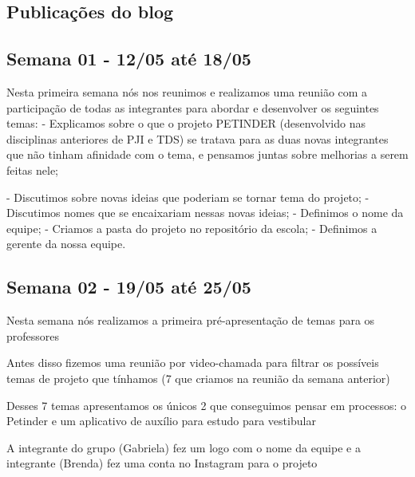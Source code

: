 \begin{apendicesenv}
\chapter{Publicações do blog}
\label{publicacoes-blog}
\begin{flushleft} %
    \section{Semana 01 - 12/05 até 18/05}


Nesta primeira semana nós nos reunimos e realizamos uma reunião com a participação de todas as integrantes para abordar e desenvolver os seguintes temas:
 \newline
- Explicamos sobre o que o projeto PETINDER (desenvolvido nas disciplinas anteriores de \ac{PJI} e \ac{TDS}) se tratava para as duas novas integrantes que não tinham afinidade com o tema, e pensamos juntas sobre melhorias a serem feitas nele;
 \newline
 
- Discutimos sobre novas ideias que poderiam se tornar tema do projeto;
  \newline
- Discutimos nomes que se encaixariam nessas novas ideias;
  \newline
- Definimos o nome da equipe;
  \newline
- Criamos a pasta do projeto no repositório da escola;
  \newline
- Definimos a gerente da nossa equipe.
\newline
\end{flushleft}
\begin{flushleft}
 \section{Semana 02 - 19/05 até 25/05}
 Nesta semana nós realizamos a primeira pré-apresentação de temas para os professores 

Antes disso fizemos uma reunião por video-chamada para filtrar os possíveis temas de projeto que tínhamos (7 que criamos na reunião da semana anterior)

Desses 7 temas apresentamos os únicos 2 que conseguimos pensar em processos: o Petinder e um aplicativo de auxílio para  estudo para vestibular

A integrante do grupo (Gabriela) fez um logo com o nome da equipe e a integrante (Brenda) fez uma conta no \gls{Instagram} para o projeto


\end{flushleft}
\end{apendicesenv}
